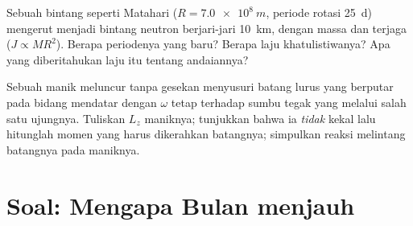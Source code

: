 \begin{exercise}[$\star\star\star$]\label{exo:b1:angular-momentum:11}
Sebuah bintang seperti Matahari ($R = \qty{7.0e8}{m}$, periode rotasi
\qty{25}{d}) mengerut menjadi bintang neutron berjari-jari \qty{10}{km},
dengan massa dan  terjaga ($J \propto MR^2$). Berapa
periodenya yang baru? Berapa laju khatulistiwanya? Apa yang
diberitahukan laju itu tentang andaiannya?
\end{exercise}

\begin{exercise}[$\star\star\star$]\label{exo:b1:angular-momentum:12}
Sebuah manik meluncur tanpa gesekan menyusuri batang lurus yang
berputar pada bidang mendatar dengan $\omega$ tetap terhadap sumbu tegak
yang melalui salah satu ujungnya. Tuliskan $L_z$ maniknya; tunjukkan
bahwa ia \emph{tidak} kekal lalu hitunglah momen yang harus dikerahkan
batangnya; simpulkan reaksi melintang batangnya pada maniknya.
\end{exercise}

\section{Soal: Mengapa Bulan menjauh}

